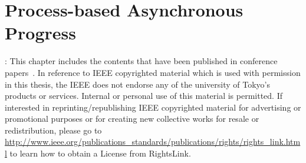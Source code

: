 \chapter{Process-based Asynchronous Progress}\label{chp:casper}

: This chapter includes the contents that have been published in
conference papers~\cite{casper}\cite{casper-scaling}. In
reference to IEEE copyrighted material which is used with permission
in this thesis, the IEEE does not endorse any of the university of Tokyo's
products or services. Internal or personal use of this material is permitted.
If interested in reprinting/republishing IEEE copyrighted material for
advertising or promotional purposes or for creating new collective works
for resale or redistribution, please go to
\url{http://www.ieee.org/publications_standards/publications/rights/rights_link.html}
to learn how to obtain a License from RightsLink.






